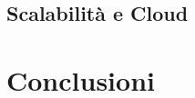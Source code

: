 \documentclass[12pt,a4paper]{report}
\begin{document}
\section{Scalabilità e Cloud}

\chapter*{Conclusioni}


% 
\end{document}
